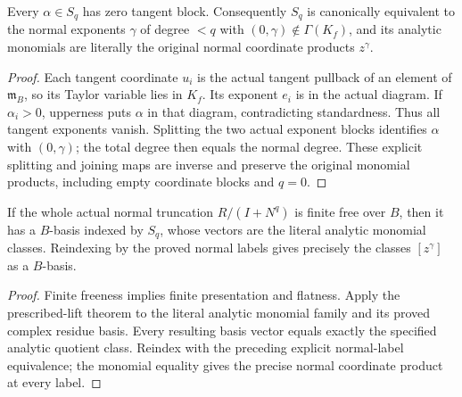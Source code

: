 \begin{theorem}
\label{hir:actual-fibre-standard-normal-labels}
\leanok
Every $\alpha\in S_q$ has zero tangent block.
Consequently $S_q$ is canonically equivalent to the normal exponents $\gamma$ of degree $<q$ with $(0,\gamma)\notin\Gamma(K_f)$, and its analytic monomials are literally the original normal coordinate products $z^\gamma$.
\end{theorem}
\begin{proof}
Each tangent coordinate $u_i$ is the actual tangent pullback of an element of $\mathfrak m_B$, so its Taylor variable lies in $K_f$.
Its exponent $e_i$ is in the actual diagram. If $\alpha_i>0$, upperness puts $\alpha$ in that diagram, contradicting standardness.
Thus all tangent exponents vanish. Splitting the two actual exponent blocks identifies $\alpha$ with $(0,\gamma)$; the total degree then equals the normal degree.
These explicit splitting and joining maps are inverse and preserve the original monomial products, including empty coordinate blocks and $q=0$.
\end{proof}

\begin{theorem}
\label{hir:actual-normal-truncation-standard-basis}
\leanok
If the whole actual normal truncation $R/(I+N^q)$ is finite free over $B$, then it has a $B$-basis indexed by $S_q$, whose vectors are the literal analytic monomial classes. Reindexing by the proved normal labels gives precisely the classes $[z^\gamma]$ as a $B$-basis.
\end{theorem}
\begin{proof}
Finite freeness implies finite presentation and flatness.
Apply the prescribed-lift theorem to the literal analytic monomial family and its proved complex residue basis.
Every resulting basis vector equals exactly the specified analytic quotient class. Reindex with the preceding explicit normal-label equivalence; the monomial equality gives the precise normal coordinate product at every label.
\end{proof}

